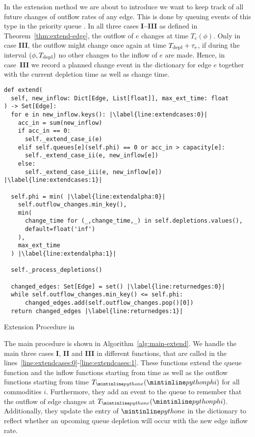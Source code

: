 In the extension method we are about to introduce we want to keep track of all future changes of outflow rates of any edge.
This is done by queuing events of this type in the priority queue .
In all three cases \textbf{I--III} as defined in Theorem~\ref{thm:extend-edge}, the outflow of $e$ changes at time $T_e(\phi)$.
Only in case \textbf{III}, the outflow might change once again at time $T_{\textnormal{depl}} + \tau_e$, if during the interval $(\phi, T_{\textnormal{depl}})$ no other changes to the inflow of $e$ are made.
Hence, in case~\textbf{III} we record a planned change event in the dictionary  for edge $e$ together with the current depletion time as well as change time.

\begin{algorithm}[ht]
    \begin{verbatim}
def extend(
  self, new_inflow: Dict[Edge, List[float]], max_ext_time: float
) -> Set[Edge]:
  for e in new_inflow.keys(): |\label{line:extendcases:0}|
    acc_in = sum(new_inflow)
    if acc_in == 0:
      self._extend_case_i(e)
    elif self.queues[e](self.phi) == 0 or acc_in > capacity[e]:
      self._extend_case_ii(e, new_inflow[e])
    else:
      self._extend_case_iii(e, new_inflow[e]) |\label{line:extendcases:1}|

  self.phi = min( |\label{line:extendalpha:0}|
    self.outflow_changes.min_key(),
    min(
      change_time for (_,change_time,_) in self.depletions.values(),
      default=float('inf')
    ),
    max_ext_time
  ) |\label{line:extendalpha:1}|

  self._process_depletions()
    
  changed_edges: Set[Edge] = set() |\label{line:returnedges:0}|
  while self.outflow_changes.min_key() <= self.phi:
      changed_edges.add(self.outflow_changes.pop()[0])
  return changed_edges |\label{line:returnedges:1}|

    \end{verbatim}
    \caption{Extension Procedure in }
    \label{alg:main-extend}
\end{algorithm}


The main procedure is shown in Algorithm~\ref{alg:main-extend}.
We handle the main three cases \textbf{I}, \textbf{II} and \textbf{III} in different functions, that are called in the  lines~\ref{line:extendcases:0}-\ref{line:extendcases:1}.
These functions extend the queue function  and the inflow functions  starting from time  as well as the outflow functions  starting from time $T_{\code{e}}(\code{phi})$ for all commodities $i$.
Furthermore, they add an event to the queue  to remember that the outflow of edge  changes at $T_{\code{e}}(\code{phi})$.
Additionally, they update the entry of $\code{e}$ in the dictionary  to reflect whether an upcoming queue depletion will occur with the new edge inflow rate.


